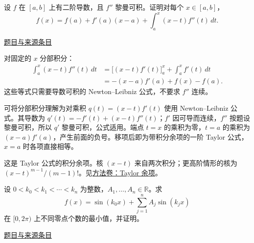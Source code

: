 \documentclass[12pt,fontset=fandol]{ctexart}
\begin{document}
\begin{example}[来源序号2]\label{ex:fin03-all:2}\label{pr:fin03-all:2}

设 $f$ 在 $[a,b]$ 上有二阶导数，且 $f''$ 黎曼可积。证明对每个 $x\in[a,b]$，
\[
f(x)=f(a)+f'(a)(x-a)+\int_a^x(x-t)f''(t)\,dt.
\]

\par\href{https://github.com/lzxcr/cmc-mathematics/blob/64916fa1fdbc3e444a652eca204d5669058ee321/src/problems/finals/03/02.md}{题目与来源条目}

\end{example}

\begin{solve}\label{ans:fin03-all:2}

对固定的 $x$ 分部积分：
\[
\begin{aligned}
\int_a^x(x-t)f''(t)\,dt
&=\bigl[(x-t)f'(t)\bigr]_a^x+\int_a^x f'(t)\,dt\\
&=-(x-a)f'(a)+f(x)-f(a).
\end{aligned}
\]
这些等式只需要导数可积的 Newton--Leibniz 公式，不要求 $f''$ 连续。

可将分部积分理解为对乘积 $q(t)=(x-t)f'(t)$ 使用 Newton--Leibniz 公式。其导数为 $q'(t)=-f'(t)+(x-t)f''(t)$；$f'$ 因可导而连续，$f''$ 按题设黎曼可积，所以 $q'$ 黎曼可积，公式适用。端点 $t=x$ 的乘积为零，$t=a$ 的乘积为 $(x-a)f'(a)$，产生前面的负号。移项后即为带积分余项的一阶 Taylor 公式，$x=a$ 时各项直接相等。

\end{solve}

\begin{remark}[方法与条件]这是 Taylor 公式的积分余项。核 $(x-t)$ 来自两次积分；更高阶情形的核为 $(x-t)^{m-1}/(m-1)!$。见\hyperref[app:estimate-taylor]{方法卷：Taylor 余项}。\end{remark}

\begin{example}[来源序号3]\label{ex:fin03-all:3}\label{pr:fin03-all:3}

设 $0<k_0<k_1<\cdots<k_n$ 为整数，$A_1,\ldots,A_n\in\mathbb R$。求
\[
f(x)=\sin(k_0x)+\sum_{j=1}^n A_j\sin(k_jx)
\]
在 $[0,2\pi)$ 上不同零点个数的最小值，并证明。

\par\href{https://github.com/lzxcr/cmc-mathematics/blob/64916fa1fdbc3e444a652eca204d5669058ee321/src/problems/finals/03/03.md}{题目与来源条目}

\end{example}
\end{document}
